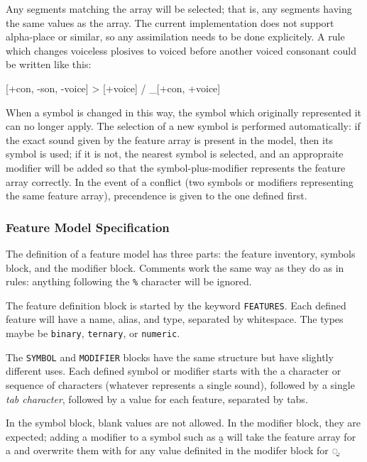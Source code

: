 \documentclass[10pt,letterpaper]{article}
\newcommand\textIPA[1]{{\fontIPA #1}}
\newcounter{excounter}
\newenvironment{vex}[1]{
  \vspace{1em}
  \refstepcounter{excounter}
  \noindent\makebox[3em][l]{(\arabic{excounter}\label{#1})}
  \minipage{\textwidth}
  \verbatim
}{
  \endverbatim
  \endminipage
  \vspace{1em}
}
\begin{document}
\noindent
Any segments matching the array will be selected; that is, any segments having the same values as the array. The current implementation does not support alpha-place or similar, so any assimilation needs to be done explicitely. A rule which changes voiceless plosives to voiced before another voiced consonant could be written like this:

\begin{vex}{ex:voicing_assimilation}
[+con, -son, -voice] > [+voice] / _[+con, +voice]
\end{vex}

When a symbol is changed in this way, the symbol which originally represented it can no longer apply. The selection of a new symbol is performed automatically: if the exact sound given by the feature array is present in the model, then its symbol is used; if it is not, the nearest symbol is selected, and an appropraite modifier will be added so that the symbol-plus-modifier represents the feature array correctly. In the event of a conflict (two symbols or modifiers representing the same feature array), precendence is given to the one defined first.

\subsubsection{Feature Model Specification}
\label{ssub:feature_model_specification}
The definition of a feature model has three parts: the feature inventory, symbols block, and the modifier block. Comments work the same way as they do as in rules: anything following the \texttt{\%} character will be ignored.

The feature definition block is started by the keyword \texttt{FEATURES}. Each defined feature will have a name, alias, and type, separated by whitespace. The types maybe be \texttt{binary}, \texttt{ternary}, or \texttt{numeric}. 

The \texttt{SYMBOL} and \texttt{MODIFIER} blocks have the same structure but have slightly different uses. Each defined symbol or modifier starts with the a character or sequence of characters (whatever represents a single sound), followed by a single \emph{tab character}, followed by a value for each feature, separated by tabs.

In the symbol block, blank values are not allowed. In the modifier block, they are expected; adding a modifier to a symbol such as \textIPA{a̰} will take the feature array for \textIPA{a} and overwrite them with for any value definited in the modifer block for \textIPA{◌̰}.
\end{document}
